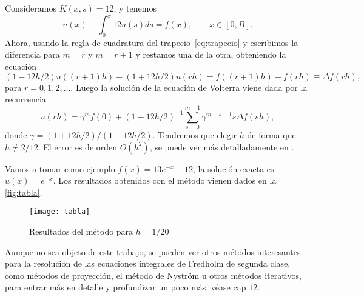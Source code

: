 \begin{ejemplo}
	Consideramos $K(x,s) = 12$, y tenemos
	\begin{equation}
		u(x) - \int_{0}^{x}12u(s)ds = f(x), \qquad x \in [0,B].
	\end{equation}
	Ahora, usando la regla de cuadratura del trapecio~\eqref{eq:trapecio} y escribimos la diferencia para $m = r$ y $m = r+1$ y restamos una de la otra, obteniendo la ecuación
	\begin{equation}
		(1-12h/2)u((r+1)h)-(1+12h/2)u(rh) = f((r+1)h)-f(rh) \equiv \Delta f(rh),
	\end{equation}
	para $r = 0,1,2,... .$ Luego la solución de la ecuación de Volterra viene dada por la recurrencia
	\begin{equation}
		u(rh) = \gamma^m f(0) + (1- 12h/2)^{-1}\sum_{s=0}^{m-1} \gamma^{m-s-1} s\Delta f(sh),
	\end{equation}
	donde $\gamma = (1 + 12h/2)/(1-12h/2)$. Tendremos que elegir $h$ de forma que $h \neq 2/12$. El error es de orden $O(h^2)$, se puede ver más detalladamente en \cite{cuadratura}.
	
	Vamos a tomar como ejemplo $f(x) = 13e^{-x}-12$, la solución exacta es $u(x) = e^{-x}$. Los resultados obtenidos con el método vienen dados en la \autoref{fig:tabla}.
	\begin{figure}[h!]
		\centering
		\texttt{[image: tabla]}
		\caption{Resultados del método para $h = 1/20$}
		\label{fig:tabla}
	\end{figure}
\end{ejemplo}

Aunque no sea objeto de este trabajo, se pueden ver otros métodos interesantes para la resolución de las ecuaciones integrales de Fredholm de segunda clase, como métodos de proyección, el método de Nyström u otros métodos iterativos, para entrar más en detalle y profundizar un poco más, véase \cite{Atkinson} cap $12$.

\endinput
